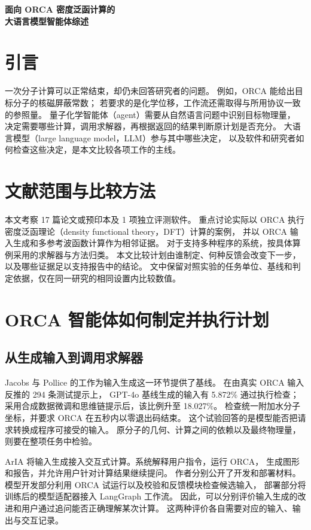 \documentclass[UTF8,a4paper,11pt,fontset=fandol]{ctexart}
\begin{document}
\thispagestyle{plain}
\begin{center}
  {\LARGE\bfseries 面向 ORCA 密度泛函计算的\\[.3ex]大语言模型智能体综述\par}
\end{center}

\section{引言}
一次分子计算可以正常结束，却仍未回答研究者的问题。
例如，ORCA 能给出目标分子的核磁屏蔽常数；
若要求的是化学位移，工作流还需取得与所用协议一致的参照量\cite{quntur}。
量子化学智能体（agent）需要从自然语言问题中识别目标物理量，
决定需要哪些计算，调用求解器，再根据返回的结果判断原计划是否充分。
大语言模型（large language model，LLM）参与其中哪些决定，
以及软件和研究者如何检查这些决定，是本文比较各项工作的主线。

\section{文献范围与比较方法}
本文考察 17 篇论文或预印本及 1 项独立评测软件。
重点讨论实际以 ORCA 执行密度泛函理论（density functional theory，DFT）计算的案例，
并以 ORCA 输入生成和多参考波函数计算作为相邻证据。
对于支持多种程序的系统，按具体算例采用的求解器与方法归类。
本文比较计划由谁制定、何种反馈会改变下一步，以及哪些证据足以支持报告中的结论。
文中保留对照实验的任务单位、基线和判定依据，仅在同一研究的相同设置内比较数值。

\section{ORCA 智能体如何制定并执行计划}

\subsection{从生成输入到调用求解器}
Jacobs 与 Pollice 的工作为输入生成这一环节提供了基线。
在由真实 ORCA 输入反推的 294 条测试提示上，
GPT-4o 基线生成的输入有 5.872\% 通过执行检查；
采用合成数据微调和思维链提示后，该比例升至 18.027\%。
检查统一附加水分子坐标，并要求 ORCA 在五秒内以零退出码结束。
这个试验回答的是模型能否把请求转换成程序可接受的输入。
原分子的几何、计算之间的依赖以及最终物理量，则要在整项任务中检验\cite{input}。

ArIA 将输入生成接入交互式计算。系统解释用户指令，运行 ORCA，
生成图形和报告，并允许用户针对计算结果继续提问。
作者分别公开了开发和部署材料。
模型开发部分利用 ORCA 试运行以及校验和反馈模块检查候选输入，
部署部分将训练后的模型适配器接入 LangGraph 工作流\cite{aria}。
因此，可以分别评价输入生成的改进和用户通过追问能否正确理解某次计算。
这两种评价各自需要对应的输入、输出与交互记录。
\end{document}
